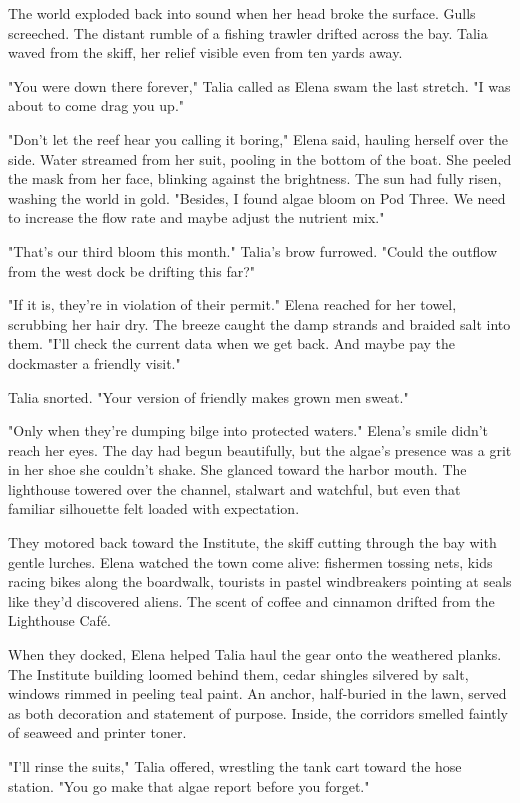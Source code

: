 The world exploded back into sound when her head broke the surface. Gulls screeched. The distant rumble of a fishing trawler drifted across the bay. Talia waved from the skiff, her relief visible even from ten yards away.

"You were down there forever," Talia called as Elena swam the last stretch. "I was about to come drag you up."

"Don't let the reef hear you calling it boring," Elena said, hauling herself over the side. Water streamed from her suit, pooling in the bottom of the boat. She peeled the mask from her face, blinking against the brightness. The sun had fully risen, washing the world in gold. "Besides, I found algae bloom on Pod Three. We need to increase the flow rate and maybe adjust the nutrient mix."

"That's our third bloom this month." Talia's brow furrowed. "Could the outflow from the west dock be drifting this far?"

"If it is, they're in violation of their permit." Elena reached for her towel, scrubbing her hair dry. The breeze caught the damp strands and braided salt into them. "I'll check the current data when we get back. And maybe pay the dockmaster a friendly visit."

Talia snorted. "Your version of friendly makes grown men sweat."

"Only when they're dumping bilge into protected waters." Elena's smile didn't reach her eyes. The day had begun beautifully, but the algae's presence was a grit in her shoe she couldn't shake. She glanced toward the harbor mouth. The lighthouse towered over the channel, stalwart and watchful, but even that familiar silhouette felt loaded with expectation.

They motored back toward the Institute, the skiff cutting through the bay with gentle lurches. Elena watched the town come alive: fishermen tossing nets, kids racing bikes along the boardwalk, tourists in pastel windbreakers pointing at seals like they'd discovered aliens. The scent of coffee and cinnamon drifted from the Lighthouse Café.

When they docked, Elena helped Talia haul the gear onto the weathered planks. The Institute building loomed behind them, cedar shingles silvered by salt, windows rimmed in peeling teal paint. An anchor, half-buried in the lawn, served as both decoration and statement of purpose. Inside, the corridors smelled faintly of seaweed and printer toner.

"I'll rinse the suits," Talia offered, wrestling the tank cart toward the hose station. "You go make that algae report before you forget."

